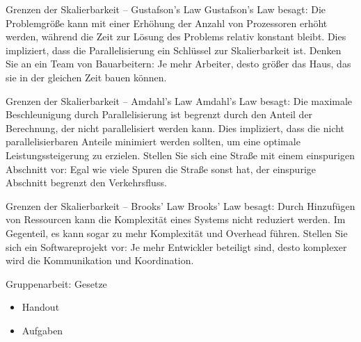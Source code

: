 \documentclass{beamer}
\begin{document}
\begin{frame}{Grenzen der Skalierbarkeit -- Gustafson's Law}
Gustafson's Law besagt: Die Problemgröße kann mit einer Erhöhung der Anzahl von Prozessoren erhöht werden, während die Zeit zur Lösung des Problems relativ konstant bleibt. Dies impliziert, dass die Parallelisierung ein Schlüssel zur Skalierbarkeit ist.  Denken Sie an ein Team von Bauarbeitern:  Je mehr Arbeiter, desto größer das Haus, das sie in der gleichen Zeit bauen können.
\end{frame}

\begin{frame}{Grenzen der Skalierbarkeit -- Amdahl's Law}
    Amdahl's Law besagt:  Die maximale Beschleunigung durch Parallelisierung ist begrenzt durch den Anteil der Berechnung, der nicht parallelisiert werden kann.  Dies impliziert, dass die nicht parallelisierbaren Anteile minimiert werden sollten, um eine optimale Leistungssteigerung zu erzielen.  Stellen Sie sich eine Straße mit einem einspurigen Abschnitt vor:  Egal wie viele Spuren die Straße sonst hat, der einspurige Abschnitt begrenzt den Verkehrsfluss.

\end{frame}

\begin{frame}{Grenzen der Skalierbarkeit -- Brooks' Law}
 Brooks' Law besagt: Durch Hinzufügen von Ressourcen kann die Komplexität eines Systems nicht reduziert werden.  Im Gegenteil, es kann sogar zu mehr Komplexität und Overhead führen.  Stellen Sie sich ein Softwareprojekt vor: Je mehr Entwickler beteiligt sind, desto komplexer wird die Kommunikation und Koordination.
\end{frame}

\begin{frame}{Gruppenarbeit: Gesetze}
      \begin{itemize}
        \item Handout
        \item Aufgaben    
      \end{itemize}
\end{frame}
\end{document}
